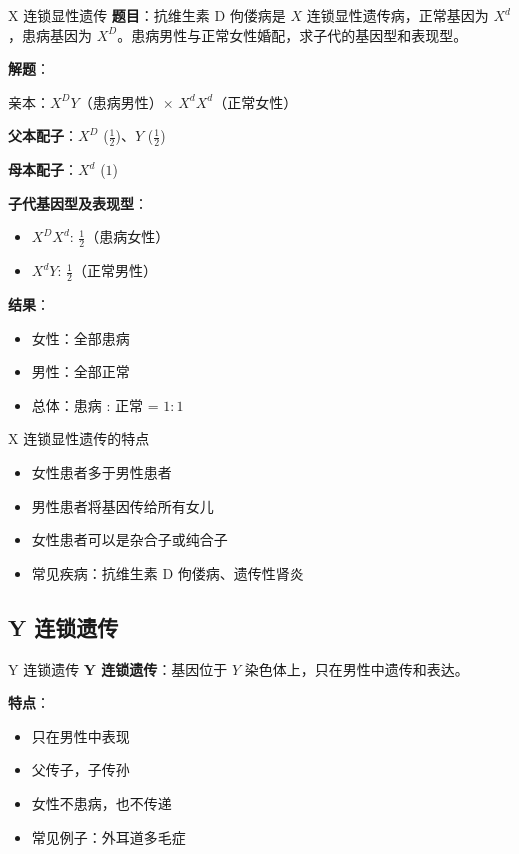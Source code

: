 \documentclass[a4paper,11pt]{ctexart}
\begin{document}
\begin{examplebox}{X 连锁显性遗传}
\textbf{题目}：抗维生素 D 佝偻病是 $X$ 连锁显性遗传病，正常基因为 $X^d$，患病基因为 $X^D$。患病男性与正常女性婚配，求子代的基因型和表现型。

\textbf{解题}：

亲本：$X^DY$（患病男性）$\times$ $X^dX^d$（正常女性）

\textbf{父本配子}：$X^D$ ($\frac{1}{2}$)、$Y$ ($\frac{1}{2}$)

\textbf{母本配子}：$X^d$ ($1$)

\textbf{子代基因型及表现型}：
\begin{itemize}[leftmargin=2em]
    \item $X^DX^d$: $\frac{1}{2}$（患病女性）
    \item $X^dY$: $\frac{1}{2}$（正常男性）
\end{itemize}

\textbf{结果}：
\begin{itemize}[leftmargin=2em]
    \item 女性：全部患病
    \item 男性：全部正常
    \item 总体：患病 : 正常 = $1:1$
\end{itemize}
\end{examplebox}

\begin{lemmabox}{X 连锁显性遗传的特点}
\begin{itemize}[leftmargin=2em]
    \item 女性患者多于男性患者
    \item 男性患者将基因传给所有女儿
    \item 女性患者可以是杂合子或纯合子
    \item 常见疾病：抗维生素 D 佝偻病、遗传性肾炎
\end{itemize}
\end{lemmabox}

\subsection{Y 连锁遗传}

\begin{definitionbox}{Y 连锁遗传}
\textbf{Y 连锁遗传}：基因位于 $Y$ 染色体上，只在男性中遗传和表达。

\textbf{特点}：
\begin{itemize}[leftmargin=2em]
    \item 只在男性中表现
    \item 父传子，子传孙
    \item 女性不患病，也不传递
    \item 常见例子：外耳道多毛症
\end{itemize}
\end{definitionbox}
\end{document}
